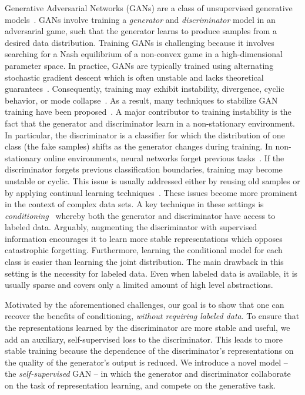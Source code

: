 \documentclass[10pt,twocolumn,letterpaper]{article}
\begin{document}
Generative Adversarial Networks (GANs) are a class of unsupervised generative models~\citep{goodfellow2014generative}.
GANs involve training a \emph{generator} and \emph{discriminator} model in an adversarial game, such that the generator learns to produce samples from a desired data distribution.
Training GANs is challenging because it involves searching for a Nash equilibrium of a non-convex game in a high-dimensional parameter space. In practice, GANs are typically trained using alternating stochastic gradient descent which is often unstable and lacks theoretical guarantees~\cite{salimans2016improved}. Consequently, training may exhibit instability, divergence, cyclic behavior, or mode collapse~\citep{mescheder2018training}. As a result, many techniques to stabilize GAN training have been proposed~\citep{mao2016least,gulrajani2017improved,miyato2018spectral,abn,radford2016,zhang2018self,karras2017progressive}. A major contributor to training instability is the fact that the generator and discriminator learn in a non-stationary environment. In particular, the discriminator is a classifier for which the distribution of one class (the fake samples) shifts as the generator changes during training. In non-stationary online environments, neural networks forget previous tasks~\cite{kirkpatrick2017overcoming,mccloskey1989catastrophic,french1999catastrophic}. If the discriminator forgets previous classification boundaries, training may become unstable or cyclic. This issue is usually addressed either by reusing old samples or by applying continual learning techniques~\citep{thanh2018catastrophic,anonymous2019generative,seff2017continual,shrivastava2017learning,kim2018memorization,grnarova2017online}.
These issues become more prominent in the context of complex data sets. A key technique in these settings is \emph{conditioning}~\citep{zhang2018self,odena2017,miyato2018cgans,brock2018large} whereby
both the generator and discriminator have access to labeled data. Arguably, augmenting the discriminator with supervised information encourages it to learn more stable representations which opposes catastrophic forgetting. Furthermore, learning the conditional model for each class is easier than learning the joint distribution. The main drawback in this setting is the necessity for labeled data. Even when labeled data is available, it is usually sparse and covers only a limited amount of high level abstractions.

Motivated by the aforementioned challenges, our goal is to show that one can recover the benefits of conditioning, \emph{without requiring labeled data}. To ensure that the representations learned by the discriminator are more stable and useful, we add an auxiliary, self-supervised loss to the discriminator. This leads to more stable training because the dependence of the discriminator's representations on the quality of the generator's output is reduced. We introduce a novel model -- the \emph{self-supervised} GAN -- in which the generator and discriminator collaborate on the task of representation learning, and compete on the generative task.
\end{document}
